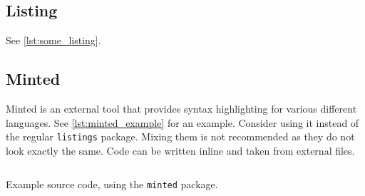 \subsection{Listing}

See \cref{lst:some_listing}.



\subsection{Minted}

Minted is an external tool that provides syntax highlighting for various different languages.
See \cref{lst:minted_example} for an example.
Consider using it instead of the regular \texttt{listings} package.
Mixing them is not recommended as they do not look exactly the same.
Code can be written inline and taken from external files.

\begin{listing}
	\capstart
	\inputminted{haskell}{code/sample.hs}
	\caption{Example source code, using the \texttt{minted} package.}
	\label{lst:minted_example}
\end{listing}
